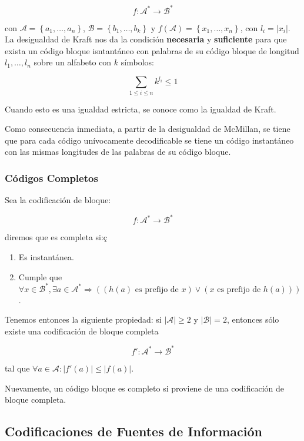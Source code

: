 \[
f:\mathcal{A}^*\rightarrow\mathcal{B}^*
\]

con \(\mathcal{A}=\left\{a_1,\dots,a_n\right\}\),
\(\mathcal{B}=\left\{b_1,\dots,b_k\right\}\) y
\(f\left(\mathcal{A}\right)=\left\{x_1,\dots,x_n\right\}\), con
\(l_i = \left|x_i\right|\). La desigualdad de Kraft nos da la condición
\textbf{necesaria} y \textbf{suficiente} para que exista un código
bloque isntantáneo con palabras de su código bloque de longitud
\(l_1,\dots,l_n\) sobre un alfabeto con \(k\) símbolos:

\[
\sum_{1\leq i\leq n}k^{l_i}\leq 1
\]

Cuando esto es una igualdad estricta, se conoce como la igualdad de
Kraft.

Como consecuencia inmediata, a partir de la desigualdad de McMillan, se
tiene que para cada código unívocamente decodificable se tiene un código
instantáneo con las mismas longitudes de las palabras de su código
bloque.

\subsubsection{Códigos Completos}\label{cuxf3digos-completos}

Sea la codificación de bloque:

\[
f:\mathcal{A}^*\rightarrow\mathcal{B}^*
\]

diremos que es completa si:ç

\begin{enumerate}
\def\labelenumi{\arabic{enumi}.}
\tightlist
\item
  Es instantánea.
\item
  Cumple que
  \(\forall x\in\mathcal{B}^*,\exists a\in\mathcal{A}^*\Rightarrow\left(\left(h(a)\text{ es prefijo de }x\right)\vee\left(x\text{ es prefijo de }h(a)\right)\right)\).
\end{enumerate}

Tenemos entonces la siguiente propiedad: si
\(\left|\mathcal{A}\right|\geq 2\) y \(\left|\mathcal{B}\right|=2\),
entonces sólo existe una codificación de bloque completa

\[
f':\mathcal{A}^*\rightarrow\mathcal{B}^*
\]

tal que
\(\forall a\in\mathcal{A}:\left|f'(a)\right|\leq\left|f(a)\right|\).

Nuevamente, un código bloque es completo si proviene de una codificación
de bloque completa.

\subsection{Codificaciones de Fuentes de
Información}\label{codificaciones-de-fuentes-de-informaciuxf3n}

